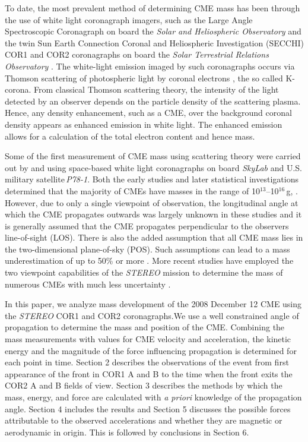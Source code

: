To date, the most prevalent method of determining CME mass has been through the use of white light coronagraph imagers, such as the Large 
Angle Spectroscopic Coronagraph  \citep[LASCO;][]{bru95} on board the \emph{Solar and Heliospheric Observatory} \citep[\emph{SOHO};][]
{dom95}  and the twin Sun Earth Connection Coronal and Heliospheric Investigation (SECCHI) COR1 and COR2 coronagraphs \citep{how08} on 
board the \emph{Solar Terrestrial Relations Observatory}  \citep[\emph{STEREO};][]{kai08}. The white-light emission imaged by such coronagraphs 
occurs via Thomson scattering of photospheric light by coronal electrons \citep{min30, vdeh50, bil66}, the so called K-corona.  From classical 
Thomson scattering theory, the intensity of the light detected by an observer depends on the particle density of the scattering plasma. Hence, any 
density enhancement, such as a CME, over the background coronal density appears as enhanced emission in white light. The enhanced emission 
allows for a calculation of the total electron content and hence mass. 

Some of the first measurement of CME mass using scattering theory were carried out by \citet{munro1979} and \citet{poland1981} using space-based 
white light coronagraphs on board \emph{SkyLab} and U.S. military satellite\,\emph{P78-1}.  Both the early studies  and later statistical 
investigations determined that the majority of CMEs have masses in the range of 10$^{13}$--10$^{16}$\,g, \citep{vourlidas02, vour2010}. However, 
due to only a single viewpoint of observation, the longitudinal angle at which the CME propagates outwards was largely unknown in these studies 
and it is generally assumed that the CME propagates perpendicular to the observers line-of-sight (LOS). There is also the added assumption that all 
CME mass lies in the two-dimensional plane-of-sky (POS). Such assumptions can lead to a mass underestimation of up to 50\% or more \citep
{vou00}. More recent studies have employed the two viewpoint capabilities of the \emph{STEREO} mission to determine the mass of numerous 
CMEs with much less uncertainty \citep{cola09}. 
	
In this paper, we analyze mass development of the 2008 December 12 CME using the \emph{STEREO} COR1 and COR2 
coronagraphs.We use a well constrained angle of propagation to determine the mass and position of the CME. Combining the mass measurements 
with values for CME velocity and acceleration, the kinetic energy and the magnitude of the force influencing propagation is determined for each point in time.  
Section 2 describes the observations of the event from first appearance of the front in COR1 A and B to the time when the front exits the COR2 A 
and B fields of view. 
Section 3 describes the methods by which the mass, energy, and force are calculated with \emph{a priori} knowledge of the propagation angle. 
Section 4 includes the results and Section 5 discusses the possible forces attributable to the observed accelerations and whether they are 
magnetic or aerodynamic in origin. This is followed by conclusions in Section 6.

